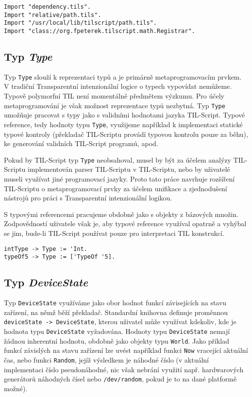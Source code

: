 \begin{lstlisting}[caption={Příklad využití výrazů Import}]
Import "dependency.tils".
Import "relative/path.tils".
Import "/usr/local/lib/tilscript/path.tils".
Import "class://org.fpeterek.tilscript.math.Registrar".
\end{lstlisting}

\subsection{Typ \textit{Type}}

Typ \lstinline{Type} slouží k reprezentaci typů a je primárně metaprogramovacím prvkem. V tradiční
Transparentní intenzionální logice o typech vypovídat nemůžeme. Typově polymorfní TIL není
momentálně předmětem výzkumu. Pro účely metaprogramování je však možnost reprezentace typů
nezbytná. Typ \lstinline{Type} umožňuje pracovat s typy jako s validními hodnotami jazyka
TIL-Script. Typové reference, tedy hodnoty typu \lstinline{Type}, využijeme například
k implementaci statické typové kontroly (překladač TIL-Scriptu provádí typovou kontrolu pouze
za běhu), ke generování validních TIL-Script programů, apod.

Pokud by TIL-Script typ \lstinline{Type} neobsahoval, musel by být za účelem analýzy TIL-Scriptu
implementován parser TIL-Scriptu v TIL-Scriptu, nebo by uživatelé museli využívat jiné programovací
jazyky. Proto tato práce navrhuje rozšíření TIL-Scriptu o metaprogramovací prvky za účelem
unifikace a zjednodušení nástrojů pro práci s Transparentní intenzionální logikou.

S typovými referencemi pracujeme obdobně jako s objekty z bázových množin. Zodpovědností uživatele
však je, aby typové reference využíval opatrně a vyhýbal se jim, bude-li TIL-Script používat pouze
pro interpretaci TIL konstrukcí.

\begin{lstlisting}[caption={Příklad využití typových referencí}]
intType -> Type := 'Int.
typeOf5 -> Type := ['TypeOf '5].
\end{lstlisting}

\subsection{Typ \textit{DeviceState}}

Typ \lstinline{DeviceState} využíváme jako obor hodnot funkcí závisejících na stavu zařízení,
na němž běží překladač. Standardní knihovna definuje proměnnou
\lstinline{deviceState -> DeviceState}, kterou uživatel může využívat kdekoliv, kde je hodnota typu
\lstinline{DeviceState} vyžadována. Hodnoty typu \lstinline{DeviceState} nemají žádnou inherentní
hodnotu, obdobně jako objekty typu \lstinline{World}. Jako příklad funkcí závislých na stavu
zařízení lze uvést například funkci \lstinline{Now} vracející aktuální čas, nebo funkci
\lstinline{Random}, jejíž výsledkem je náhodné číslo (v aktuální implementaci číslo pseudonáhodné,
nic však nebrání využití např. hardwarových generátorů náhodných čísel nebo
\lstinline{/dev/random}, pokud je to na dané platformě možné).

